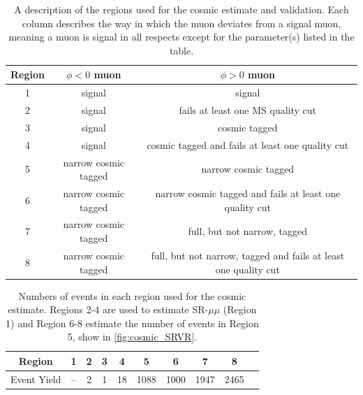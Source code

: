 \begin{table}
\centering
\begin{tabular}{ccc}
Region & $\phi < 0$ muon & $\phi > 0$ muon \\
\hline
1 & signal & signal\\ 
2 & signal & fails at least one MS quality cut\\ 
3 & signal & cosmic tagged \\ 
4 & signal & cosmic tagged and fails at least one quality cut\\ 
5 & narrow cosmic tagged & narrow cosmic tagged\\ 
6 & narrow cosmic tagged & narrow cosmic tagged and fails at least one quality cut\\ 
7 & narrow cosmic tagged & full, but not narrow, tagged \\ 
8 & narrow cosmic tagged & full, but not narrow, tagged and fails at least one quality cut\\  
\hline
\end{tabular}
\caption{A description of the regions used for the cosmic estimate and validation. Each column describes the way in which the muon deviates from a signal muon, meaning a muon is signal in all respects except for the parameter(s) listed in the table.}
\label{tab:cosmic_SRVR}
\end{table}


\begin{table}
\centering
\begin{tabular}{cccccccccc}
Region & 1    & 2 & 3 & 4 & 5 & 6 & 7 & 8\\
\hline
Event Yield & --  & 2 & 1 & 18 & 1088 & 1000 & 1947 & 2465 \\
\hline
\end{tabular}
\caption{Numbers of events in each region used for the cosmic estimate. Regions 2-4 are used to estimate SR-$\mu\mu$ (Region 1) and Region 6-8 estimate the number of events in Region 5, show in \autoref{fig:cosmic_SRVR}.}
\label{tab:estimate_counts}
\end{table}

